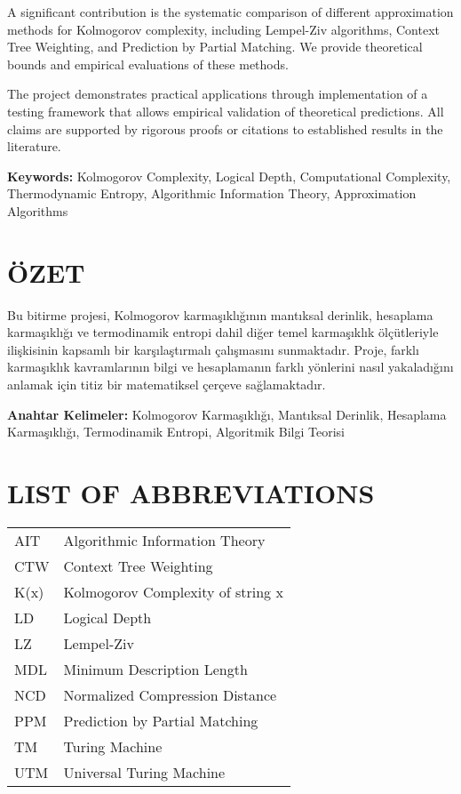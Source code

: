 \documentclass[12pt,a4paper]{report}
\begin{document}
A significant contribution is the systematic comparison of different approximation methods for Kolmogorov complexity, including Lempel-Ziv algorithms, Context Tree Weighting, and Prediction by Partial Matching. We provide theoretical bounds and empirical evaluations of these methods.

The project demonstrates practical applications through implementation of a testing framework that allows empirical validation of theoretical predictions. All claims are supported by rigorous proofs or citations to established results in the literature.

\textbf{Keywords:} Kolmogorov Complexity, Logical Depth, Computational Complexity, Thermodynamic Entropy, Algorithmic Information Theory, Approximation Algorithms

\chapter*{ÖZET}

Bu bitirme projesi, Kolmogorov karmaşıklığının mantıksal derinlik, hesaplama karmaşıklığı ve termodinamik entropi dahil diğer temel karmaşıklık ölçütleriyle ilişkisinin kapsamlı bir karşılaştırmalı çalışmasını sunmaktadır. Proje, farklı karmaşıklık kavramlarının bilgi ve hesaplamanın farklı yönlerini nasıl yakaladığını anlamak için titiz bir matematiksel çerçeve sağlamaktadır.

\textbf{Anahtar Kelimeler:} Kolmogorov Karmaşıklığı, Mantıksal Derinlik, Hesaplama Karmaşıklığı, Termodinamik Entropi, Algoritmik Bilgi Teorisi

\tableofcontents
{}

\listoffigures
{}

\listoftables
{}

\chapter*{LIST OF ABBREVIATIONS}

\begin{tabular}{ll}
AIT & Algorithmic Information Theory\\
CTW & Context Tree Weighting\\
K(x) & Kolmogorov Complexity of string x\\
LD & Logical Depth\\
LZ & Lempel-Ziv\\
MDL & Minimum Description Length\\
NCD & Normalized Compression Distance\\
PPM & Prediction by Partial Matching\\
TM & Turing Machine\\
UTM & Universal Turing Machine\\
\end{tabular}
\end{document}
